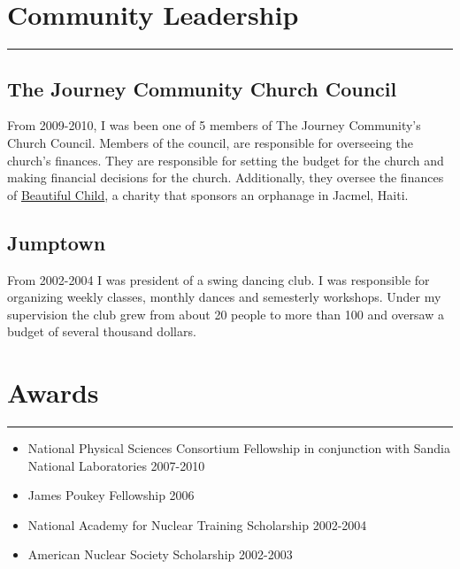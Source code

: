 \documentclass[letterpaper,11pt]{article}
\begin{document}
\section*{Community Leadership}
\hrule
\vspace{0.05in}
\subsection*{The Journey Community Church Council}
From 2009-2010, I was been one of 5 members of The Journey Community's Church
Council.  Members of the council, are responsible for overseeing the church's
finances.  They are responsible for setting the  budget for the church and
making financial decisions for the church.  Additionally, they oversee the
finances of \href{http://www.beautifulchild.org}{Beautiful Child}, a charity
that sponsors an orphanage in Jacmel, Haiti.

\subsection*{Jumptown}
From 2002-2004 I was president of a swing dancing club.  I was responsible for
organizing weekly classes, monthly dances and semesterly workshops.  Under my
supervision the club grew from about 20 people to more than 100 and oversaw a
budget of several thousand dollars.

\section*{Awards}
\hrule
\vspace{0.05in}
\begin{itemize}
	\item National Physical Sciences Consortium Fellowship in conjunction with Sandia National Laboratories 2007-2010
	\item James Poukey Fellowship 2006
	\item National Academy for Nuclear Training Scholarship 2002-2004
	\item American Nuclear Society Scholarship 2002-2003
\end{itemize}

\bigskip
\end{document}
